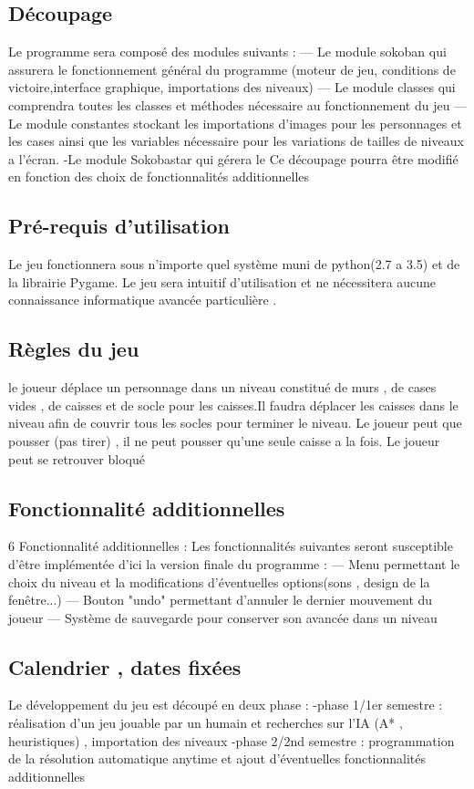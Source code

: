 \documentclass{article}
\begin{document}
		\subsection{Découpage}
		Le programme sera composé des modules suivants :
— Le module sokoban qui assurera le fonctionnement général du programme
(moteur de jeu, conditions de victoire,interface graphique, importations
des niveaux)
— Le module classes qui comprendra toutes les classes et méthodes nécessaire
au fonctionnement du jeu
— Le module constantes stockant les importations d’images pour les personnages
et les cases ainsi que les variables nécessaire pour les variations
de tailles de niveaux a l’écran.
-Le module Sokobastar qui gérera le 
Ce découpage pourra être modifié en fonction des choix de fonctionnalités additionnelles
		\subsection{Pré-requis d'utilisation}
		Le jeu fonctionnera sous n’importe quel système muni de python(2.7 a 3.5) et
de la librairie Pygame. Le jeu sera intuitif d’utilisation et ne nécessitera aucune
connaissance informatique avancée particulière .
		\subsection{Règles du jeu}
		le joueur déplace un personnage dans un niveau constitué de murs , de cases
vides , de caisses et de socle pour les caisses.Il faudra déplacer les caisses dans
le niveau afin de couvrir tous les socles pour terminer le niveau. Le joueur peut
que pousser (pas tirer) , il ne peut pousser qu’une seule caisse a la fois. Le joueur
peut se retrouver bloqué
		\subsection{Fonctionnalité additionnelles}
			6 Fonctionnalité additionnelles :
Les fonctionnalités suivantes seront susceptible d’être implémentée d’ici la
version finale du programme :
— Menu permettant le choix du niveau et la modifications d’éventuelles
options(sons , design de la fenêtre...)
— Bouton "undo" permettant d’annuler le dernier mouvement du joueur
— Système de sauvegarde pour conserver son avancée dans un niveau

		\subsection{Calendrier , dates fixées}
		Le développement du jeu est découpé en deux phase :
-phase 1/1er semestre : réalisation d’un jeu jouable par un humain et recherches
sur l’IA (A* , heuristiques) , importation des niveaux
-phase 2/2nd semestre : programmation de la résolution automatique anytime et ajout d'éventuelles fonctionnalités additionnelles
\end{document}
